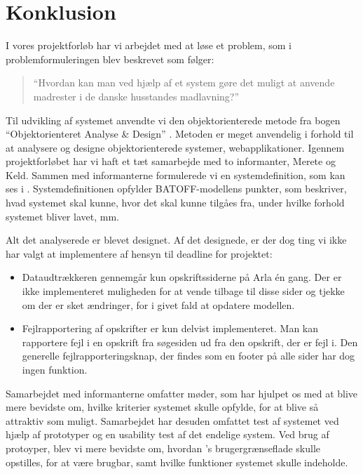 \chapter{Konklusion}
\label{chap:konklusion}

I vores projektforløb har vi arbejdet med at løse et problem, som i problemformuleringen blev beskrevet som følger:

\begin{quote}
``Hvordan kan man ved hjælp af et system gøre det muligt at anvende madrester i de danske husstandes madlavning?''
\end{quote}

Til udvikling af systemet anvendte vi den objektorienterede metode fra bogen ``Objektorienteret Analyse \& Design'' \cite{ooad}. Metoden er meget anvendelig i forhold til at analysere og designe objektorienterede systemer, \fx webapplikationer.  
Igennem projektforløbet har vi haft et tæt samarbejde med to informanter, Merete og Keld. Sammen med informanterne formulerede vi en systemdefinition, som kan ses i . Systemdefinitionen opfylder BATOFF-modellens punkter, som beskriver, hvad systemet skal kunne, hvor det skal kunne tilgåes fra, under hvilke forhold systemet bliver lavet, mm.

Alt det analyserede er blevet designet. Af det designede, er der dog ting vi ikke har valgt at implementere af hensyn til deadline for projektet:

\begin{itemize}[noitemsep]
\item Dataudtrækkeren gennemgår kun opskriftssiderne på Arla én gang. Der er ikke implementeret muligheden for at vende tilbage til disse sider og tjekke om der er sket ændringer, for i givet fald at opdatere modellen.
\item Fejlrapportering af opskrifter er kun delvist implementeret. Man kan rapportere fejl i en opskrift fra søgesiden ud fra den opskrift, der er fejl i. Den generelle fejlrapporteringsknap, der findes som en footer på alle sider har dog ingen funktion.
\end{itemize}

Samarbejdet med informanterne omfatter møder, som har hjulpet os med at blive mere bevidste om, hvilke kriterier systemet skulle opfylde, for at blive så attraktiv som muligt. Samarbejdet har desuden omfattet test af systemet ved hjælp af prototyper og en usability test af det endelige system. Ved brug af protoyper, blev vi mere bevidste om, hvordan \Foodl{}'s brugergrænseflade skulle opstilles, for at være brugbar, samt hvilke funktioner systemet skulle indeholde.

